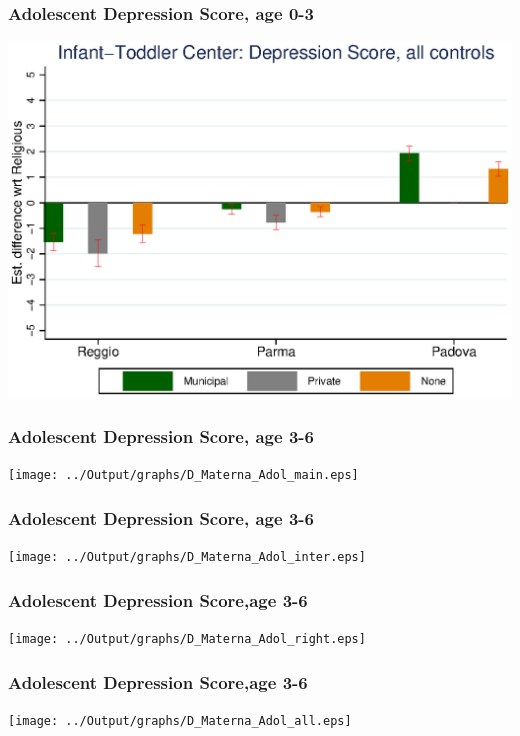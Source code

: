 \documentclass{beamer}
\begin{document}
\begin{frame}\frametitle{Adolescent Depression Score, age 0-3}
\center
\includegraphics[scale=0.7]{../Output/graphs/D_Asilo_Adol_all.eps}
\end{frame}


\begin{frame}\frametitle{Adolescent Depression Score, age 3-6}
\center
\texttt{[image: ../Output/graphs/D\_Materna\_Adol\_main.eps]}
\end{frame}

\begin{frame}\frametitle{Adolescent Depression Score, age 3-6}
\center
\texttt{[image: ../Output/graphs/D\_Materna\_Adol\_inter.eps]}
\end{frame}

\begin{frame}\frametitle{Adolescent Depression Score,age 3-6}
\center
\texttt{[image: ../Output/graphs/D\_Materna\_Adol\_right.eps]}
\end{frame}

\begin{frame}\frametitle{Adolescent Depression Score,age 3-6}
\center
\texttt{[image: ../Output/graphs/D\_Materna\_Adol\_all.eps]}
\end{frame}
\end{document}
